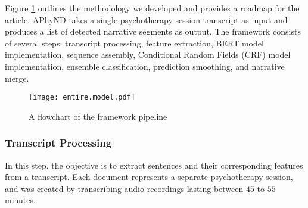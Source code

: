\documentclass[preprint,12pt]{elsarticle}
\begin{document}
Figure \ref{fig:framework.pipeline} outlines the methodology we developed and provides a roadmap for the article. APhyND takes a single psychotherapy session transcript as input and produces a list of detected narrative segments as output. The framework consists of several steps: transcript processing, feature extraction, BERT \cite{devlin2018bert} model implementation, sequence assembly, Conditional Random Fields (CRF)  \cite{lafferty2001conditional} model implementation, ensemble classification, prediction smoothing, and narrative merge.

\begin{figure}[ht]
  \centering
  \texttt{[image: entire.model.pdf]}
  \caption{A flowchart of the framework pipeline}
   \label{fig:framework.pipeline}
\end{figure}


\subsubsection{Transcript Processing}

In this step, the objective is to extract sentences and their corresponding features from a transcript. Each document represents a separate psychotherapy session, and was created by transcribing audio recordings lasting between $45$ to $55$ minutes.
\end{document}
